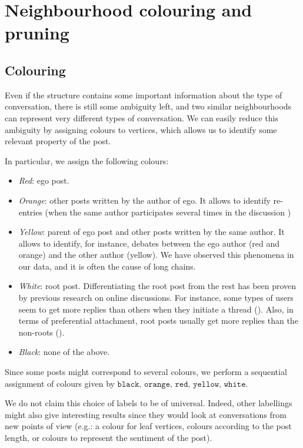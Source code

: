\documentclass[conference]{IEEEtran}
\begin{document}
\section{Neighbourhood colouring and pruning}\label{sec:colouring_pruning}
\subsection{Colouring}
Even if the structure contains some important information about the type of conversation, there is still some ambiguity left, and two similar neighbourhoods can represent very different types of conversation. We can easily reduce this ambiguity by assigning colours to vertices, which allows us to identify some relevant property of the post. 

In particular, we assign the following colours:

\begin{itemize}
\item \textit{Red}: ego post.
\item \textit{Orange}: other posts written by the author of ego. It allows to identify re-entries (when the same author participates several times in the discussion \cite{Backstrom2013})
\item \textit{Yellow}: parent of ego post and other posts written by the same author. It allows to identify, for instance, debates between the ego author (red and orange) and the other author (yellow). We have observed this phenomena in our data, and it is often the cause of long chains.
\item \textit{White}: root post. Differentiating the root post from the rest has been proven by previous research on online discussions. For instance, some types of users seem to get more replies than others when they initiate a thread (\cite{Himelboim2009,  Lumbreras2013}). Also, in terms of preferential attachment, root posts usually get more replies than the non-roots (\cite{Gomez2010, Gomez2012}).
\item \textit{Black}: none of the above.
\end{itemize}
Since some posts might correspond to several colours, we perform a sequential assignment of colours given by $\texttt{black, orange, red, yellow, white}$. 

We do not claim this choice of labels to be of universal. Indeed, other labellings might also give interesting results since they would look at conversations from new points of view (e.g.: a colour for leaf vertices, colours according to the post length, or colours to represent the sentiment of the post). 
\end{document}

